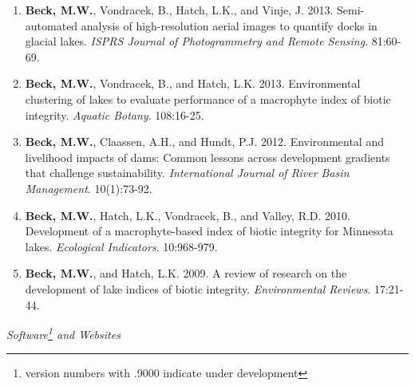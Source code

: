 \documentclass[letterpaper,12pt]{article}
\begin{document}
\begin{enumerate}
\item \textbf{Beck, M.W.}, Vondracek, B., Hatch, L.K., and Vinje, J. 2013. Semi-automated analysis of high-resolution aerial images to quantify docks in glacial lakes. \textit{ISPRS Journal of Photogrammetry and Remote Sensing}. 81:60-69.

\item \textbf{Beck, M.W.}, Vondracek, B., and Hatch, L.K. 2013. Environmental clustering of lakes to evaluate performance of a macrophyte index of biotic integrity. \textit{Aquatic Botany}. 108:16-25.

\item \textbf{Beck, M.W.}, Claassen, A.H., and Hundt, P.J. 2012. Environmental and livelihood impacts of dams: Common lessons across development gradients that challenge sustainability. \textit{International Journal of River Basin Management}. 10(1):73-92.

\item \textbf{Beck, M.W.}, Hatch, L.K., Vondracek, B., and Valley, R.D. 2010. Development of a macrophyte-based index of biotic integrity for Minnesota lakes. \textit{Ecological Indicators}. 10:968-979.

\item \textbf{Beck, M.W.}, and Hatch, L.K. 2009. A review of research on the development of lake indices of biotic integrity. \textit{Environmental Reviews}. 17:21-44.

\end{enumerate}

\vspace{\baselineskip} 
\centerline{\large{\textit{Software\footnote{version numbers with .9000 indicate under development} and Websites}}}
\end{document}
